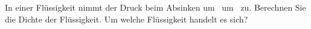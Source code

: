 In einer Flüssigkeit nimmt der Druck beim Absinken um \habO\ um \dpaO\ zu. Berechnen Sie die Dichte der Flüssigkeit. Um welche Flüssigkeit handelt es sich?
